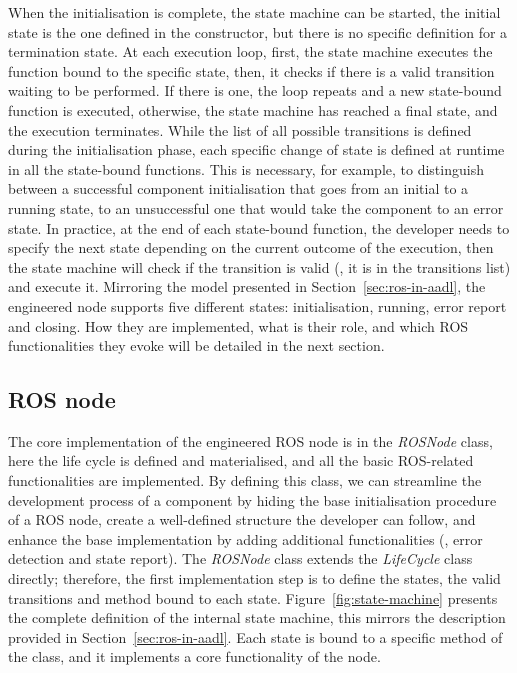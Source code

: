 When the initialisation is complete, the state machine can be started, the initial state is the one defined in the constructor, but there is no specific definition for a termination state. At each execution loop, first, the state machine executes the function bound to the specific state, then, it checks if there is a valid transition waiting to be performed. If there is one, the loop repeats and a new state-bound function is executed, otherwise, the state machine has reached a final state, and the execution terminates. While the list of all possible transitions is defined during the initialisation phase, each specific change of state is defined at runtime in all the state-bound functions. This is necessary, for example, to distinguish between a successful component initialisation that goes from an initial to a running state, to an unsuccessful one that would take the component to an error state. In practice, at the end of each state-bound function, the developer needs to specify the next state depending on the current outcome of the execution, then the state machine will check if the transition is valid (\ie, it is in the transitions list) and execute it. Mirroring the model presented in Section~\ref{sec:ros-in-aadl}, the engineered node supports five different states: initialisation, running, error report and closing. How they are implemented, what is their role, and which ROS functionalities they evoke will be detailed in the next section.

\subsection{ROS node}
The core implementation of the engineered ROS node is in the \textit{ROSNode} class, here the life cycle is defined and materialised, and all the basic ROS-related functionalities are implemented. By defining this class, we can streamline the development process of a component by hiding the base initialisation procedure of a ROS node, create a well-defined structure the developer can follow, and enhance the base implementation by adding additional functionalities (\eg, error detection and state report). The \textit{ROSNode} class extends the \textit{LifeCycle} class directly; therefore, the first implementation step is to define the states, the valid transitions and method bound to each state. Figure~\ref{fig:state-machine} presents the complete definition of the internal state machine, this mirrors the description provided in Section~\ref{sec:ros-in-aadl}. Each state is bound to a specific method of the class, and it implements a core functionality of the node.

